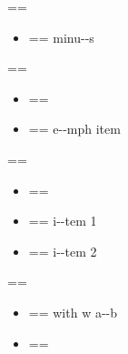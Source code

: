 \documentclass{book}
\makeatletter
\newenvironment{GNUTexinfopreformatted}{%
  \par\GNUTobeylines\obeyspaces\frenchspacing
  \parskip=\z@\parindent=\z@}{}
{\catcode`\^^M=13 \gdef\GNUTobeylines{\catcode`\^^M=13 \def^^M{\null\par}}}
\newenvironment{GNUTexinfoindented}
  {\begin{list}{}{}
  \item\relax}
  {\end{list}}
\makeatother
\begin{document}
\begin{GNUTexinfoindented}
\begin{GNUTexinfopreformatted}%
\ttfamily 
\end{GNUTexinfopreformatted}
\begin{itemize}[label=-]
\item \begin{GNUTexinfopreformatted}%
\ttfamily minu{-}{-}s
\end{GNUTexinfopreformatted}
\end{itemize}
\begin{GNUTexinfopreformatted}%
\ttfamily 
\end{GNUTexinfopreformatted}
\begin{itemize}[label=\emph{after emph}]
\item \begin{GNUTexinfopreformatted}%
\ttfamily \end{GNUTexinfopreformatted}
\item \begin{GNUTexinfopreformatted}%
\ttfamily e{-}{-}mph item
\end{GNUTexinfopreformatted}
\end{itemize}
\begin{GNUTexinfopreformatted}%
\ttfamily 
\end{GNUTexinfopreformatted}
\begin{itemize}[label=\textbullet{} a--n itemize line]
\item \begin{GNUTexinfopreformatted}%
\ttfamily \end{GNUTexinfopreformatted}
\item \begin{GNUTexinfopreformatted}%
\ttfamily {}%
i{-}{-}tem 1
\end{GNUTexinfopreformatted}
\item \begin{GNUTexinfopreformatted}%
\ttfamily i{-}{-}tem 2
\end{GNUTexinfopreformatted}
\end{itemize}
\begin{GNUTexinfopreformatted}%
\ttfamily 
\end{GNUTexinfopreformatted}
\begin{itemize}[label={}]
\item \begin{GNUTexinfopreformatted}%
\ttfamily with w a{-}{-}b
\end{GNUTexinfopreformatted}
\item \begin{GNUTexinfopreformatted}%

\end{GNUTexinfopreformatted}
\end{itemize}
\end{GNUTexinfoindented}
\end{document}
